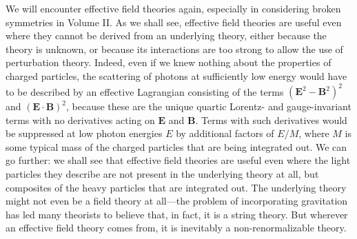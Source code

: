We will encounter effective field theories again, especially in considering
broken symmetries in Volume II. As we shall see, effective field theories are
useful even where they cannot be derived from an underlying theory, either
because the theory is unknown, or because its interactions are too strong to
allow the use of perturbation theory. Indeed, even if we knew nothing about
the properties of charged particles, the scattering of photons at
sufficiently low energy would have to be described by an effective Lagrangian
consisting of the terms $(\mathbf E^2-\mathbf B^2)^2$ and
$(\mathbf E\cdot\mathbf B)^2$, because these are the unique quartic Lorentz-
and gauge-invariant terms with no derivatives acting on $\mathbf E$ and
$\mathbf B$. Terms with such derivatives would be suppressed at low photon
energies $E$ by additional factors of $E/M$, where $M$ is some typical mass of
the charged particles that are being integrated out. We can go further: we
shall see that effective field theories are useful even where the light
particles they describe are not present in the underlying theory at all, but
composites of the heavy particles that are integrated out. The underlying
theory might not even be a field theory at all---the problem of incorporating
gravitation has led many theorists to believe that, in fact, it is a string
theory. But wherever an effective field theory comes from, it is inevitably a
non-renormalizable theory.
